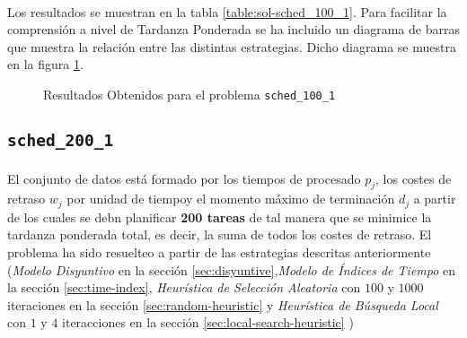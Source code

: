 \documentclass[spanish]{article}
\begin{document}
			\paragraph{}
			Los resultados se muestran en la tabla \ref{table:sol-sched_100_1}. Para facilitar la comprensión a nivel de Tardanza Ponderada se ha incluido un diagrama de barras que muestra la relación entre las distintas estrategias. Dicho diagrama se muestra en la figura \ref{plot:sol-sched_100_1}.


			\begin{figure}[h]
				\begin{center}
				\end{center}
				\caption{Resultados Obtenidos para el problema \texttt{sched\_100\_1}}
				\label{plot:sol-sched_100_1}
			\end{figure}

		\subsection{\texttt{sched\_200\_1}}

			\paragraph{}
			El conjunto de datos está formado por los tiempos de procesado $p_j$, los costes de retraso $w_j$ por unidad de tiempoy el momento máximo de terminación $d_j$ a partir de los cuales se debn planificar \textbf{200 tareas} de tal manera que se minimice la tardanza ponderada total, es decir, la suma de todos los costes de retraso. El problema ha sido resuelteo a partir de las estrategias descritas anteriormente (\emph{Modelo Disyuntivo} en la sección \ref{sec:disyuntive},\emph{Modelo de Índices de Tiempo} en la sección \ref{sec:time-index}, \emph{Heurística de Selección Aleatoria} con $100$ y $1000$ iteraciones en la sección \ref{sec:random-heuristic} y \emph{Heurística de Búsqueda Local} con $1$ y $4$ iteracciones en la sección \ref{sec:local-search-heuristic} )
\end{document}
